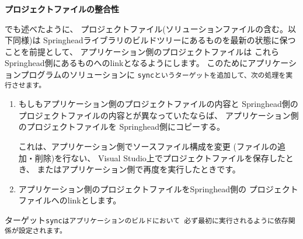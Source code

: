 
\bigskip
\noindent
\bf{プロジェクトファイルの整合性}
\begin{narrow}[20pt]
	でも述べたように、
	プロジェクトファイル(ソリューションファイルの含む。以下同様)は
	Springheadライブラリのビルドツリーにあるものを最新の状態に保つことを前提として、
	アプリケーション側のプロジェクトファイルは
	これらSpringhead側にあるものへのlinkとなるようにします。
	このためにアプリケーションプログラムのソリューションに
	\tt{sync}というターゲットを追加して、次の処理を実行させます。
	\begin{enumerate}
	  \item	もしもアプリケーション側のプロジェクトファイルの内容と
		Springhead側のプロジェクトファイルの内容とが異なっていたならば、
		アプリケーション側のプロジェクトファイルを
		Springhead側にコピーする。
		\begin{narrow}[s][15pt]
		これは、アプリケーション側でソースファイル構成を変更
		(ファイルの追加・削除)を行ない、
		Visual Studio上でプロジェクトファイルを保存したとき、
		またはアプリケーション側で再度\cmake を実行したときです。
		\end{narrow}

	  \item	アプリケーション側のプロジェクトファイルをSpringhead側の
		プロジェクトファイルへのlinkとします。
	\end{enumerate}
	ターゲット\tt{sync}はアプリケーションのビルドにおいて
	必ず最初に実行されるように依存関係が設定されます。
\end{narrow}	
